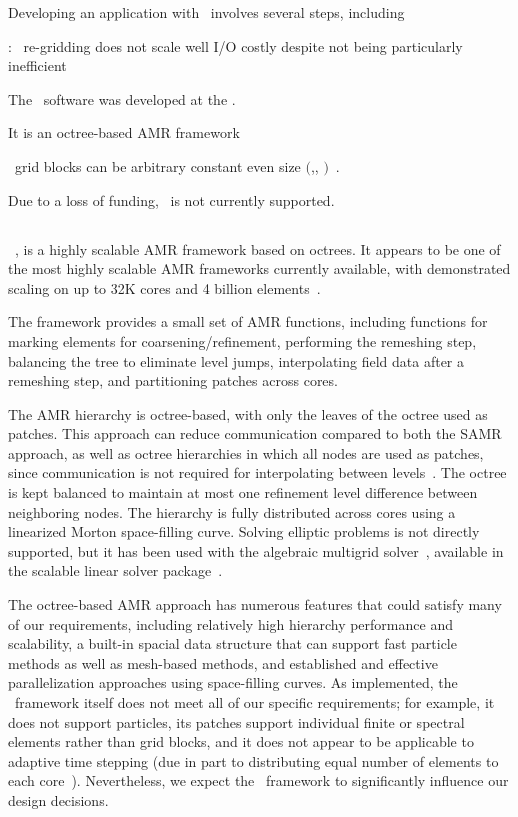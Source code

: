 \documentclass[10pt,twocolumn]{article}
\begin{document}
Developing an application with \paramesh\ involves several steps, including


 : \paramesh\ re-gridding does
not scale well I/O costly despite not being particularly inefficient

The \paramesh\ software was developed at the .

It is an octree-based AMR framework

\paramesh\ grid blocks can be arbitrary constant even size $($,, $)$~\cite{wwwparamesh}.

Due to a loss of funding, \paramesh\ is not currently supported.


\subsection{\alps } \label{ss:alps}

\alps~\cite{BuBu09}, is a highly scalable AMR framework based on
octrees.  It appears to be one of the most highly scalable AMR
frameworks currently available, with demonstrated scaling on up to 32K
cores and 4 billion elements~\cite{BuGh08}.

The framework provides a small set of AMR functions, including
functions for marking elements for coarsening/refinement, performing
the remeshing step, balancing the tree to eliminate level jumps,
interpolating field data after a remeshing step, and partitioning 
patches across cores.

The AMR hierarchy is octree-based, with only the leaves of the octree
used as patches.  This approach can reduce communication compared to
both the SAMR approach, as well as octree hierarchies in which all
nodes are used as patches, since communication is not required for
interpolating between levels~\cite{BuGh08b}.  The octree is kept
balanced to maintain at most one refinement level difference between
neighboring nodes.  The hierarchy is fully distributed across cores
using a linearized Morton space-filling curve.  Solving
elliptic problems is not directly supported, but it has been used with
the  algebraic multigrid solver~\cite{HeYa02},
available in the  scalable linear solver
package~\cite{FaJo06}.

The octree-based AMR approach has numerous features that could satisfy
many of our requirements, including relatively high hierarchy
performance and scalability, a built-in spacial data structure that
can support fast particle methods as well as mesh-based methods, and
established and effective parallelization approaches using
space-filling curves.  As implemented, the \alps\ framework itself
does not meet all of our specific requirements; for example, it does
not support particles, its patches support individual finite or
spectral elements rather than grid blocks, and it does not appear to
be applicable to adaptive time stepping (due in part to distributing
equal number of elements to each core~\cite{BuGh08b}).  Nevertheless,
we expect the \alps\ framework to significantly influence our design
decisions.
\end{document}
